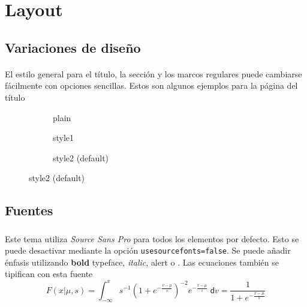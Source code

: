 \section{Layout}

\subsection{Variaciones de diseño}

\begin{frame}[fragile=singleslide]{\insertsectionhead}
  \framesubtitle{\insertsubsectionhead}
  El estilo general para el título, la sección y los marcos regulares puede cambiarse fácilmente con opciones sencillas. Estos son algunos ejemplos para la página del título
  \begin{figure}[ht!]
    \begin{subfigure}[b]{0.3\textwidth}
      \caption*{plain}
    \end{subfigure}
    \hspace{\fill}
    \begin{subfigure}[b]{0.3\textwidth}
      \caption*{style1}
    \end{subfigure}
    \hspace{\fill}
    \begin{subfigure}[b]{0.3\textwidth}
      \caption*{style2 (default)}
    \end{subfigure}
  \end{figure}
\end{frame}

\subsection{Fuentes}

\begin{frame}
  \frametitle{\insertsectionhead}
  \framesubtitle{\insertsubsectionhead}
  Este tema utiliza \textit{Source Sans Pro} para todos los elementos por defecto. Esto se puede desactivar mediante la opción  \texttt{usesourcefonts=false}.
  \vfill
  Se puede añadir énfasis utilizando \textbf{bold} typeface, \textit{italic},
  \alert{alert} o {\color{tPrim}{simple colors}}.
  \vfill
   Las ecuaciones también se tipifican con esta fuente
  \begin{equation*}
    F(x|\mu,s) = \int_{-\infty}^x s^{-1}\left(1+e^{-\frac{v-\mu}{s}}\right)^{-2} e^{-\frac{v-\mu}{s}}\;\mathsf{d}v = \frac{1}{1+e^{-\frac{x-\mu}{s}}}
  \end{equation*}
\end{frame}



